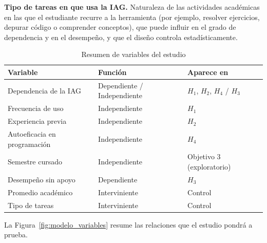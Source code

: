 \documentclass[12pt,letterpaper]{article}
\numberwithin{table}{section}
\numberwithin{figure}{section}
\begin{document}
\textbf{Tipo de tareas en que usa la IAG.} Naturaleza de las actividades académicas en las que el estudiante recurre a la herramienta (por ejemplo, resolver ejercicios, depurar código o comprender conceptos), que puede influir en el grado de dependencia y en el desempeño, y que el diseño controla estadísticamente.

\begin{table}[ht]
\centering
\caption{Resumen de variables del estudio}
\label{tab:variables}
\small
\begin{tabular}{@{}p{4.8cm}p{3.8cm}p{3.8cm}@{}}
\toprule
\textbf{Variable} & \textbf{Función} & \textbf{Aparece en} \\
\midrule
Dependencia de la IAG & Dependiente / Independiente & $H_1$, $H_2$, $H_4$ / $H_3$ \\
Frecuencia de uso & Independiente & $H_1$ \\
Experiencia previa & Independiente & $H_2$ \\
Autoeficacia en programación & Independiente & $H_4$ \\
Semestre cursado & Independiente & Objetivo 3 (exploratorio) \\
Desempeño sin apoyo & Dependiente & $H_3$ \\
Promedio académico & Interviniente & Control \\
Tipo de tareas & Interviniente & Control \\
\bottomrule
\end{tabular}
\end{table}

La Figura~\ref{fig:modelo_variables} resume las relaciones que el estudio pondrá a prueba.
\end{document}
